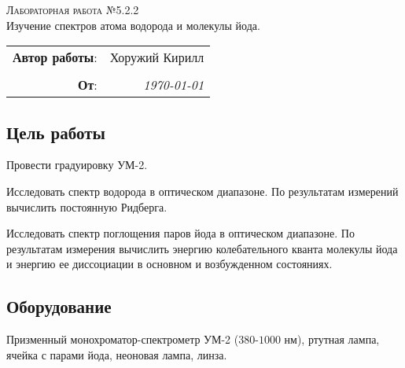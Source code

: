 
\phantom{42}
\vspace{20mm}

\begin{center}
    \LARGE \textsc{Лабораторная работа №5.2.2} \\
    \vspace{3 mm}
    \large Изучение спектров атома водорода и молекулы йода.
\end{center}


\phantom{42}

\begin{flushright}
    \begin{tabular}{rr}
        \textbf{Автор работы}: 
        & Хоружий Кирилл \\
        & \\
        \textbf{От}: &
        \textit{\today}\\
    \end{tabular}
\end{flushright}

\thispagestyle{empty}

\vspace{10mm}


\subsection*{Цель работы}
\begin{enumerate*}
    \item Провести градуировку УМ-2. 
    \item Исследовать спектр водорода  в оптическом диапазоне. По результатам измерений вычислить постоянную Ридберга. 
    \item Исследовать спектр поглощения паров йода в оптическом диапазоне. По результатам измерения вычислить энергию колебательного кванта молекулы йода и энергию ее диссоциации в основном и возбужденном состояниях.
\end{enumerate*}


\subsection*{Оборудование}
Призменный монохроматор-спектрометр УМ-2 ($380$-$1000$ нм), 
ртутная лампа, ячейка с парами йода,
неоновая лампа,
линза.


\newpage
